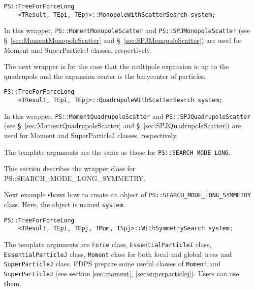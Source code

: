 \begin{screen}
\begin{verbatim}
PS::TreeForForceLong
    <TResult, TEpi, TEpj>::MonopoleWithScatterSearch system;
\end{verbatim}
\end{screen}

In this wrapper, \texttt{PS::MomentMonopoleScatter} and \texttt{PS::SPJMonopoleScatter} (see \S~\ref{sec:MomentMonopoleScatter} and \S~\ref{sec:SPJMonopoleScatter}) are used for Moment and SuperParticleJ classes, respectively.


The next wrapper is for the case that the multipole expansion is up to the quadrupole and the expansion center is the barycenter of particles.

\begin{screen}
\begin{verbatim}
PS::TreeForForceLong
    <TResult, TEpi, TEpj>::QuadrupoleWithScatterSearch system;
\end{verbatim}
\end{screen}

In this wrapper, \texttt{PS::MomentQuadrupoleScatter} and \texttt{PS::SPJQuadrupoleScatter} (see \S~\ref{sec:MomentQuadrupoleScatter} and \S~\ref{sec:SPJQuadrupoleScatter}) are used for Moment and SuperParticleJ classes, respectively.

The template arguments are the same as those for \texttt{PS::SEARCH\_MODE\_LONG}. 


This section describes the wrapper class for PS::SEARCH\_MODE\_LONG\_SYMMETRY.

Next example shows how to create an object of {\tt PS::SEARCH\_MODE\_LONG\_SYMMETRY} class.  Here, the object is named {\tt system}.

\begin{screen}
\begin{verbatim}
PS::TreeForForceLong
    <TResult, TEpi, TEpj, TMom, TSpj>::WithSymmetrySearch system;
\end{verbatim}
\end{screen}

The template arguments are {\tt Force} class, {\tt EssentialParticleI} class, {\tt EssentialParticleJ} class, {\tt Moment} class for both local and global trees and {\tt SuperParticleJ} class. FDPS prepare some useful classes of {\tt Moment} and {\tt SuperParticleJ} (see section \ref{sec:moment}, \ref{sec:superparticlej}). Users can use them.

